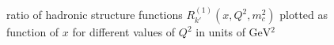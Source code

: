\pagebreak
\begin{figure}[ht!]
\centering
\begin{subfigure}[t]{\textwidth}
	
\end{subfigure}\\%
\begin{subfigure}[t]{\textwidth}
	
\end{subfigure}\\%
\begin{subfigure}[t]{\textwidth}
	
\end{subfigure}
\caption{ratio of hadronic structure functions $R_{k'}^{(1)}(x,Q^2,m_c^2)$ plotted as function of $x$ for different values of $Q^2$ in units of $\si{\GeV^2}$}\label{fig:R}
\end{figure}

\clearpage
\pagebreak
